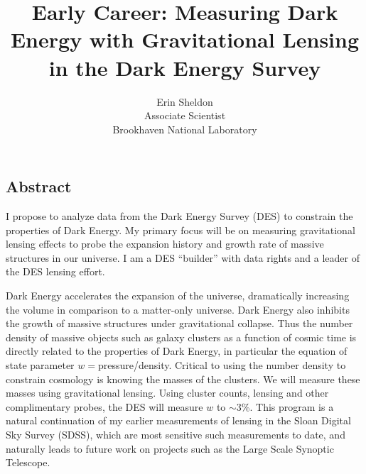 \documentclass[12pt]{article}
\begin{document}
\newpage 



\tableofcontents


\newpage

\title{Early Career: Measuring Dark Energy with Gravitational Lensing in 
the Dark Energy Survey}
\author{Erin Sheldon\\
{\normalsize Associate Scientist}\\
\normalsize{Brookhaven National Laboratory}}
\date{}
\maketitle



\begin{center}
\section*{Abstract}
\end{center}


I propose to analyze data from the Dark Energy Survey (DES) to constrain the
properties of Dark Energy.  My primary focus will be on measuring gravitational
lensing effects to probe the expansion history and growth rate of massive
structures in our universe.  I am a DES ``builder'' with data rights and a
leader of the DES lensing effort.

Dark Energy accelerates the expansion of the universe, dramatically increasing
the volume in comparison to a matter-only universe.  Dark Energy also inhibits
the growth of massive structures under gravitational collapse.  Thus the number
density of massive objects such as galaxy clusters as a function of cosmic time
is directly related to the properties of Dark Energy, in particular the
equation of state parameter $w=$pressure/density.  Critical to using the number
density to constrain cosmology is knowing the masses of the clusters. We will
measure these masses using gravitational lensing.  Using cluster counts,
lensing and other complimentary probes, the DES will measure $w$ to $\sim$3\%.
This program is a natural continuation of my earlier measurements of lensing in
the Sloan Digital Sky Survey (SDSS), which are most sensitive such measurements
to date, and naturally leads to future work on projects such as the Large Scale
Synoptic Telescope\cite{lsstweb}.
\end{document}
